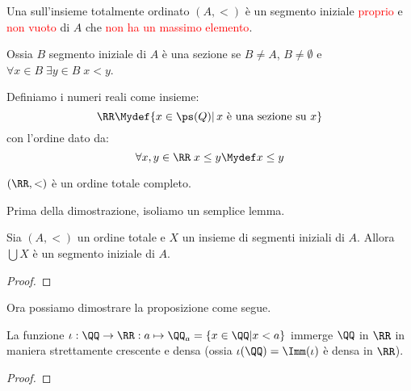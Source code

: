 \documentclass[11pt]{scrartcl}
\begin{document}
\begin{definition}
	Una  sull'insieme totalmente ordinato $(A,<)$ è un segmento iniziale \textcolor{red}{proprio}
	e \textcolor{red}{non vuoto} di $A$ che \textcolor{red}{non ha un massimo elemento}.
\end{definition}

Ossia $B$ segmento iniziale di $A$ è una sezione se $B \ne A$, $B \ne \emptyset$ e $\forall x \in B \; \exists y \in B \; x < y$.

\begin{definition}
	Definiamo i numeri reali come insieme:
	\[ \RR \Mydef \{x \in \ps(Q) | \, \text{$x$ è una sezione su $x$}\}
		\]
	con l'ordine dato da:
	\[ \forall x,y \in \RR \; x \leq y \Mydef x \leq y
		\]
\end{definition}

\begin{proposition}[$\RR$ è completo]
	$(\RR,<)$ è un ordine totale completo.
\end{proposition}

Prima della dimostrazione, isoliamo un semplice lemma.

\begin{lemma}
	Sia $(A,<)$ un ordine totale e $X$ un insieme di segmenti iniziali di $A$. Allora $\bigcup X$ è un segmento iniziale di $A$.
\end{lemma}

\begin{proof}
	
\end{proof}

Ora possiamo dimostrare la proposizione come segue.

\begin{remark}
	La funzione $\iota : \QQ \rightarrow \RR : a \mapsto \QQ_a = \{x \in \QQ | x < a\}$ immerge $\QQ$ in $\RR$ in maniera strettamente
	crescente e densa (ossia $\iota(\QQ) = \Imm(\iota)$ è densa in $\RR$).
\end{remark}

\begin{proof}
	
\end{proof}
\end{document}
